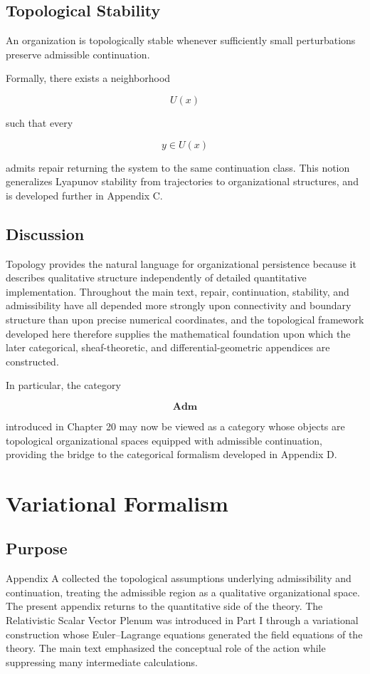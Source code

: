 \documentclass[11pt,oneside]{book}
\numberwithin{equation}{chapter}
\theoremstyle{definition}
\theoremstyle{plain}
\begin{document}
\section{Topological Stability}

An organization is topologically stable whenever sufficiently small
perturbations preserve admissible continuation.

Formally, there exists a neighborhood

\[
U(x)
\]

such that every

\[
y
\in
U(x)
\]

admits repair returning the system to the same continuation class. This notion generalizes Lyapunov stability from trajectories to organizational structures, and is developed further in Appendix C.

\section{Discussion}

Topology provides the natural language for organizational persistence because it describes qualitative structure independently of detailed quantitative implementation. Throughout the main text, repair, continuation, stability, and admissibility have all depended more strongly upon connectivity and boundary structure than upon precise numerical coordinates, and the topological framework developed here therefore supplies the mathematical foundation upon which the later categorical, sheaf-theoretic, and differential-geometric appendices are constructed.

In particular, the category

\[
\mathbf{Adm}
\]

introduced in Chapter 20 may now be viewed as a category whose objects are
topological organizational spaces equipped with admissible continuation,
providing the bridge to the categorical formalism developed in Appendix D.

\chapter{Variational Formalism}

\section{Purpose}

Appendix A collected the topological assumptions underlying admissibility
and continuation, treating the admissible region as a qualitative
organizational space. The present appendix returns to the quantitative
side of the theory. The Relativistic Scalar Vector Plenum was introduced in
Part I through a variational construction whose Euler--Lagrange equations
generated the field equations of the theory. The main text emphasized the
conceptual role of the action while suppressing many intermediate
calculations.
\end{document}
